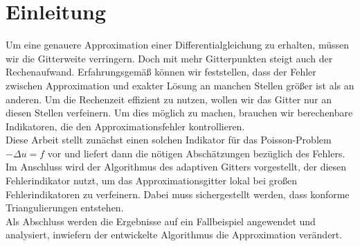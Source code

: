 \chapter{Einleitung}
\renewcommand{\thepage}{\arabic{page}}
\setcounter{page}{1}
Um eine genauere Approximation einer Differentialgleichung zu erhalten, müssen wir die Gitterweite verringern. Doch mit mehr Gitterpunkten steigt auch der Rechenaufwand. Erfahrungsgemäß können wir feststellen, dass der Fehler zwischen Approximation und exakter Lösung an manchen Stellen größer ist als an anderen. Um die Rechenzeit effizient zu nutzen, wollen wir das Gitter nur an diesen Stellen verfeinern. Um dies möglich zu machen, brauchen wir berechenbare Indikatoren, die den Approximationsfehler kontrollieren. \\
Diese Arbeit stellt zunächst einen solchen Indikator für das Poisson-Problem $-\Delta u =f$ vor und liefert dann die nötigen Abschätzungen bezüglich des Fehlers. Im Anschluss wird der Algorithmus des adaptiven Gitters vorgestellt, der diesen Fehlerindikator nutzt, um das Approximationsgitter lokal bei großen Fehlerindikatoren zu verfeinern. Dabei muss sichergestellt werden, dass konforme Triangulierungen entstehen. \\
Als Abschluss werden die Ergebnisse auf ein Fallbeispiel angewendet und analysiert, inwiefern der entwickelte Algorithmus die Approximation verändert.